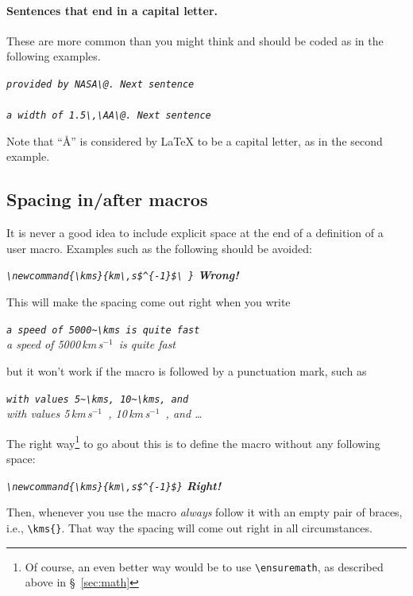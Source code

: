 \documentclass[debug]{rmxaa}
\newcommand{\CS}[1]{\texttt{\textbackslash #1}}
\newenvironment{Example}
{\begin{list}{}{\setlength{\leftmargin}{10pt}\setlength{\rightmargin}{10pt}}%
  \item[]\itshape}
  {\end{list}}
\begin{document}
\paragraph{Sentences that end in a capital letter.} These are more common
than you might think and should be coded as in the following examples. 
\begin{Example}
  \verb+provided by NASA\@. Next sentence+\\
  \\[0.5\baselineskip]
  \verb+a width of 1.5\,\AA\@. Next sentence+\\
\end{Example}
Note that ``\AA'' is considered by \LaTeX{} to be a capital letter, as
in the second example. 



\subsection{Spacing in/after macros}
\label{sec:macrospace}
It is never a good idea to include explicit space at the end of a
definition of a user macro. Examples such as the following should be
avoided:
\begin{Example}
  \verb+\newcommand{\kms}{km\,s$^{-1}$\ }+ \hfill\textbf{Wrong!}
\end{Example}
This will make the spacing come out right when you write
\begin{Example}
  \newcommand{\kms}{km\,s$^{-1}$\ }
  \verb+a speed of 5000~\kms is quite fast+\\
  a speed of 5000\,\kms is quite fast
\end{Example}
but it won't work if the macro is followed by a punctuation mark, such
as 
\begin{Example}
  \newcommand{\kms}{km\,s$^{-1}$\ }
  \verb+with values 5~\kms, 10~\kms, and+\\
  with values 5\,\kms, 10\,\kms, and \dots
\end{Example}

The right way\footnote{Of course, an even better way would be to use
  \CS{ensuremath}, as described above in \S~\ref{sec:math}} to go
about this is to define the macro without any following space:
\begin{Example}
  \verb+\newcommand{\kms}{km\,s$^{-1}$}+ \hfill\textbf{Right!}
\end{Example}
Then, whenever you use the macro \emph{always} follow it with an empty
pair of braces, i.e., \verb+\kms{}+. That way the spacing will come
out right in all circumstances. 
\end{document}
